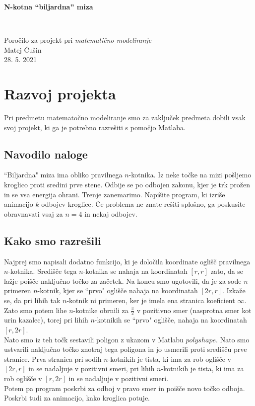 \documentclass[12pt]{article}
\begin{document}
\thispagestyle{empty}
\begin{center}
\begin{Large}
{\bf N-kotna ``biljardna'' miza}
\end{Large}
\\[5mm]
\begin{large}
Poročilo za projekt pri {\em matematično modeliranje}
\\[5mm]
{\sc Matej Čušin}
\\[10mm]
28. 5. 2021
\end{large}

\end{center}

\newpage
\setcounter{page}{1}
\noindent
\section{Razvoj projekta}

Pri predmetu matematočno modeliranje smo za zaključek predmeta dobili vsak svoj projekt, ki ga je potrebno razrešiti s pomočjo Matlaba.\\



\subsection{Navodilo naloge}

``Biljardna" miza ima obliko pravilnega $n$-kotnika. Iz neke točke na mizi pošljemo kroglico proti sredini prve stene. Odbije se po odbojen zakonu, kjer je trk prožen in se vsa energija ohrani. Trenje zanemarimo. Napišite program, ki izriše animacijo $k$ odbojev kroglice. Če problema ne znate rešiti splošno, ga poskusite obravnavati vsaj za $n = 4$ in nekaj odbojev.

\subsection{Kako smo razrešili}

Najprej smo napisali dodatno funkcijo, ki je določila koordinate oglišč pravilnega $n$-kotnika. Središče tega $n$-kotnika se nahaja na koordinatah $[r, r]$ zato, da se lažje poišče naključno točko za začetek. Na koncu smo ugotovili, da je za sode $n$ primeren $n$-kotnik, kjer se ``prvo" oglišče nahaja na koordinatah $[2r, r]$. Izkaže se, da pri lihih tak $n$-kotnik ni primeren, ker je imela ena stranica koeficient $\infty$. Zato smo potem lihe $n$-kotnike obrnili za $\frac{\pi}{2}$ v pozitivno smer (nasprotna smer kot urin kazalec), torej pri lihih $n$-kotnikih se ``prvo" oglišče, nahaja na koordinatah $[r, 2r]$. \\
Nato smo iz teh točk sestavili poligon z ukazom v Matlabu $polyshape$. Nato smo ustvarili naključno točko znotraj tega poligona in jo usmerili proti središču prve stranice. Prva stranica pri sodih $n$-kotnikih je tista, ki ima za rob oglišče v $[2r, r]$ in se nadaljuje v pozitivni smeri, pri lihih $n$-kotnikih je tista, ki ima za rob oglišče v $[r, 2r]$ in se nadaljuje v pozitivni smeri.\\
Potem pa program poskrbi za odboj v pravo smer in  poišče novo točko odboja. Poskrbi tudi za animacijo, kako kroglica potuje.
\end{document}
